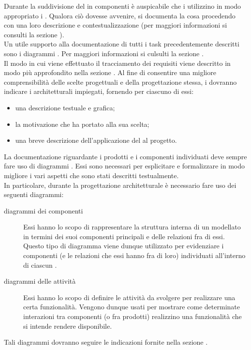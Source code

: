 			Durante la suddivisione del  in componenti è auspicabile che i  utilizzino in modo appropriato i . Qualora ciò dovesse avvenire, si documenta la cosa procedendo con una loro descrizione e contestualizzazione (per maggiori informazioni si consulti la sezione ).\\
			Un utile supporto alla documentazione di tutti i task precedentemente descritti sono i diagrammi . Per maggiori informazioni si culsulti la sezione .\\
			Il modo in cui viene effettuato il tracciamento dei requisiti viene descritto in modo più approfondito nella sezione .
				 \label{sec:ProgArcDesingPattern}
					Al fine di consentire una migliore comprensibilità delle scelte progettuali e della progettazione stessa, i  dovranno indicare i  architetturali impiegati, fornendo per ciascuno di essi:
					\begin{itemize}
						\item una descrizione testuale e grafica;
						\item la motivazione che ha portato alla sua scelta;
						\item una breve descrizione dell'applicazione del  al progetto.
					\end{itemize}
				 \label{sec:ProgArcUML}
					La documentazione riguardante i prodotti e i componenti individuati deve sempre fare uso di diagrammi . Essi sono necessari per esplicitare e formalizzare in modo migliore i vari aspetti che sono stati descritti testualmente.\\
					In particolare, durante la progettazione architetturale è necessario fare uso dei seguenti diagrammi:
					\begin{description}
						\item[diagrammi dei componenti] Essi hanno lo scopo di rappresentare la struttura interna di un   modellato in termini dei suoi componenti principali e delle relazioni fra di essi. Questo tipo di diagramma viene dunque utilizzato per evidenziare i componenti (e le relazioni che essi hanno fra di loro) individuati all'interno di ciascun  .
						\item[diagrammi delle attività] Essi hanno lo scopo di definire le attività da svolgere per realizzare una certa funzionalità. Vengono dunque usati per mostrare come determinate interazioni tra componenti (o fra prodotti) realizzino una funzionalità che si intende rendere disponibile.
					\end{description}
					Tali diagrammi dovranno seguire le indicazioni fornite nella sezione .

